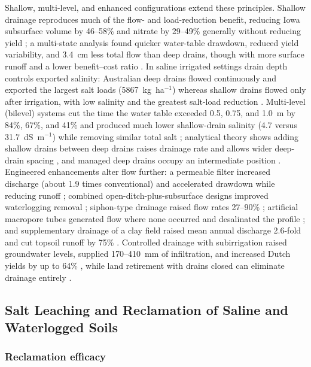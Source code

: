 \documentclass[11pt]{article}
\begin{document}
Shallow, multi-level, and enhanced configurations extend these principles.
Shallow drainage reproduces much of the flow- and load-reduction benefit,
reducing Iowa subsurface volume by 46--58\% and nitrate by 29--49\% generally
without reducing yield \parencite{Helmers2012,Schott2017}; a multi-state analysis
found quicker water-table drawdown, reduced yield variability, and 3.4~cm less
total flow than deep drains, though with more surface runoff and a lower
benefit--cost ratio \parencite{Ghane2021b}. In saline irrigated settings drain
depth controls exported salinity: Australian deep drains flowed continuously and
exported the largest salt loads (5867~kg~ha$^{-1}$) whereas shallow drains flowed
only after irrigation, with low salinity and the greatest salt-load reduction
\parencite{Christen2001b}. Multi-level (bilevel) systems cut the time the water
table exceeded 0.5, 0.75, and 1.0~m by 84\%, 67\%, and 41\% and produced much
lower shallow-drain salinity (4.7 versus 31.7~dS~m$^{-1}$) while removing similar
total salt \parencite{Hornbuckle2007}; analytical theory shows adding shallow
drains between deep drains raises drainage rate and allows wider deep-drain
spacing \parencite{Hornbuckle2012}, and managed deep drains occupy an
intermediate position \parencite{Ayars2006b,Christen2001b}. Engineered
enhancements alter flow further: a permeable filter increased discharge (about
1.9 times conventional) and accelerated drawdown while reducing runoff
\parencite{Tao2016,Tao2017}; combined open-ditch-plus-subsurface designs improved
waterlogging removal \parencite{Ren2021,Tao2025}; siphon-type drainage raised
flow rates 27--90\% \parencite{Ren2023}; artificial macropore tubes generated
flow where none occurred and desalinated the profile \parencite{Chen2021}; and
supplementary drainage of a clay field raised mean annual discharge 2.6-fold and
cut topsoil runoff by 75\% \parencite{Häggblom2019}. Controlled drainage with
subirrigation raised groundwater levels, supplied 170--410~mm of infiltration,
and increased Dutch yields by up to 64\%
\parencite{deWit2022,deWit2024,FAUSEY1995,Almen2021,Madramootoo2007}, while land
retirement with drains closed can eliminate drainage entirely
\parencite{Purkey2001}.

\subsection{Salt Leaching and Reclamation of Saline and Waterlogged Soils}

\subsubsection{Reclamation efficacy}
\end{document}
